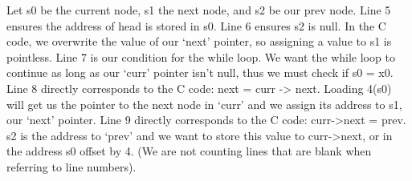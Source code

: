 \begin{blocksection}
\begin{solution}[0.9in]
Let s0 be the current node, s1 the next node, and s2 be our prev node. Line 5 ensures the address of head is stored in s0. Line 6 ensures s2 is null. In the C code, we overwrite the value of our ‘next’ pointer, so assigning a value to s1 is pointless. Line 7 is our condition for the while loop. We want the while loop to continue as long as our ‘curr’ pointer isn’t null, thus we must check if s0 = x0. Line 8 directly corresponds to the C code: next = curr -> next. Loading 4(s0) will get us the pointer to the next node in ‘curr’ and we assign its address to s1, our ‘next’ pointer. Line 9 directly corresponds to the C code: curr->next = prev. s2 is the address to ‘prev’ and we want to store this value to curr->next, or in the address s0 offset by 4.  (We are not counting lines that are blank when referring to line numbers).

\end{solution}
\end{blocksection}